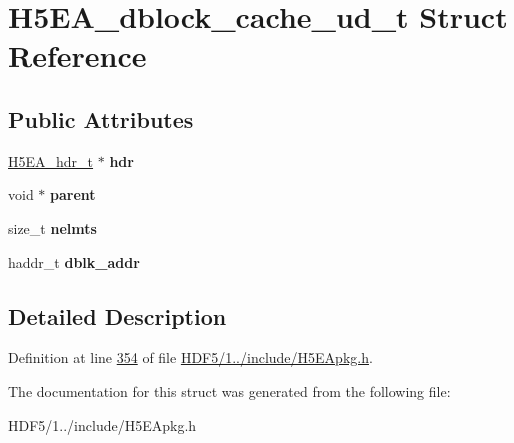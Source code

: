 \hypertarget{struct_h5_e_a__dblock__cache__ud__t}{}\section{H5\+E\+A\+\_\+dblock\+\_\+cache\+\_\+ud\+\_\+t Struct Reference}
\label{struct_h5_e_a__dblock__cache__ud__t}
\subsection*{Public Attributes}
\begin{DoxyCompactItemize}
\item 
\mbox{\label{struct_h5_e_a__dblock__cache__ud__t_a31ef4cc94e97481d1a99c8f9b43a8e14}} 
\hyperlink{struct_h5_e_a__hdr__t}{H5\+E\+A\+\_\+hdr\+\_\+t} $\ast$ {\bfseries hdr}
\item 
\mbox{\label{struct_h5_e_a__dblock__cache__ud__t_a73f33beb4d436c10a095b106bcd22dfb}} 
void $\ast$ {\bfseries parent}
\item 
\mbox{\label{struct_h5_e_a__dblock__cache__ud__t_a406deaa5bf040cd653f91f64909f9a8b}} 
size\+\_\+t {\bfseries nelmts}
\item 
\mbox{\label{struct_h5_e_a__dblock__cache__ud__t_a3968b4b015bcefc383ec44aaa27193ae}} 
haddr\+\_\+t {\bfseries dblk\+\_\+addr}
\end{DoxyCompactItemize}


\subsection{Detailed Description}


Definition at line \hyperlink{_h_d_f5_21_810_81_2include_2_h5_e_apkg_8h_source_l00354}{354} of file \hyperlink{_h_d_f5_21_810_81_2include_2_h5_e_apkg_8h_source}{H\+D\+F5/1../include/\+H5\+E\+Apkg.\+h}.



The documentation for this struct was generated from the following file\+:\begin{DoxyCompactItemize}
\item 
H\+D\+F5/1../include/\+H5\+E\+Apkg.\+h\end{DoxyCompactItemize}
